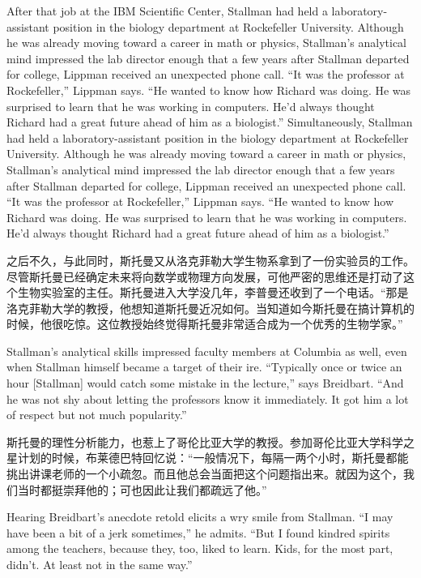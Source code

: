 \ifdefined\eng
\ifdefined\vone
After that job at the IBM Scientific Center, Stallman had held a laboratory-assistant position in the biology department at Rockefeller University. Although he was already moving toward a career in math or physics, Stallman's analytical mind impressed the lab director enough that a few years after Stallman departed for college, Lippman received an unexpected phone call. ``It was the professor at Rockefeller,'' Lippman says. ``He wanted to know how Richard was doing. He was surprised to learn that he was working in computers. He'd always thought Richard had a great future ahead of him as a biologist.''
\fi
\ifdefined\vtwo
Simultaneously, Stallman had held a laboratory-assistant position in the biology department at Rockefeller University. Although he was already moving toward a career in math or physics, Stallman's analytical mind impressed the lab director enough that a few years after Stallman departed for college, Lippman received an unexpected phone call. ``It was the professor at Rockefeller,'' Lippman says. ``He wanted to know how Richard was doing. He was surprised to learn that he was working in computers. He'd always thought Richard had a great future ahead of him as a biologist.''
\fi
\fi

\ifdefined\chs
\ifdefined\vone 之后不久，\fi\ifdefined\vtwo 与此同时，\fi 斯托曼又从洛克菲勒大学生物系拿到了一份实验员的工作。尽管斯托曼已经确定未来将向数学或物理方向发展，可他严密的思维还是打动了这个生物实验室的主任。斯托曼进入大学没几年，李普曼还收到了一个电话。``那是洛克菲勒大学的教授，他想知道斯托曼近况如何。当知道如今斯托曼在搞计算机的时候，他很吃惊。这位教授始终觉得斯托曼非常适合成为一个优秀的生物学家。''
\fi

\ifdefined\eng
Stallman's analytical skills impressed faculty members at Columbia as well, even when Stallman himself became a target of their ire. ``Typically once or twice an hour [Stallman] would catch some mistake in the lecture,'' says Breidbart. ``And he was not shy about letting the professors know it immediately. It got him a lot of respect but not much popularity.''
\fi

\ifdefined\chs
斯托曼的理性分析能力，也惹上了哥伦比亚大学的教授。参加哥伦比亚大学科学之星计划的时候，布莱德巴特回忆说：``一般情况下，每隔一两个小时，斯托曼都能挑出讲课老师的一个小疏忽。而且他总会当面把这个问题指出来。就因为这个，我们当时都挺崇拜他的；可也因此让我们都疏远了他。''
\fi

\ifdefined\eng
Hearing Breidbart's anecdote retold elicits a wry smile from Stallman. ``I may have been a bit of a jerk sometimes,'' he admits. ``But I found kindred spirits among \ifdefined\vone the \fi teachers, because they, too, liked to learn. Kids, for the most part, didn't. At least not in the same way.''
\fi

